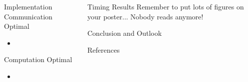 \documentclass[serif,mathserif,final]{beamer}
\begin{document}
\begin{frame}{}
\begin{columns}[t]
\begin{column}{0.32\linewidth}
    \end{column}%

    \begin{column}{0.32\linewidth}

      \begin{block}{Implementation}
      Communication Optimal \cite{Driscoll2013}
        \begin{itemize}
          \item 
        \end{itemize}
      Computation Optimal \cite{Koanantakool}
        \begin{itemize}
          \item 
        \end{itemize}
      \end{block}

    \end{column}%

    \begin{column}{0.32\linewidth}

      \begin{block}{Timing Results}
        Remember to put lots of figures on your poster... Nobody reads anymore!
      \end{block}

      \begin{block}{Conclusion and Outlook}
        
      \end{block}

      \begin{block}{References}
        
	{\footnotesize
	}
      \end{block}

    \end{column}%

  \end{columns}
\end{frame}
\end{document}
